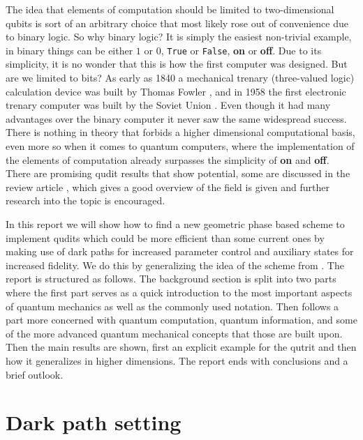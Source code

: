 \documentclass[pra,showpacs,priprent,twocolumn,superscriptaddress]{revtex4-1}
\begin{document}
The idea that elements of computation should be limited to two-dimensional qubits is sort of an arbitrary choice that most likely rose out of convenience due to binary logic. So why binary logic? It is simply the easiest non-trivial example, in binary things can be either $1$ or $0$, {\tt True} or {\tt False}, \textbf{on} or \textbf{off}. Due to its simplicity, it is no wonder that this is how the first computer was designed. But are we limited to bits? As early as 1840 a mechanical trenary (three-valued logic) calculation device was built by Thomas Fowler \cite{glusker05}, and in 1958 the first electronic trenary computer was built by the Soviet Union \cite{bursentsov11}. Even though it had many advantages over the binary computer it never saw the same widespread success. There is nothing in theory that forbids a higher dimensional computational basis, even more so when it comes to quantum computers, where the implementation of the elements of computation already surpasses the simplicity of \textbf{on} and \textbf{off}. There are promising qudit results that show potential, some are discussed in the review article \cite{wang20}, which gives a good overview of the field is given and further research into the topic is encouraged.

In this report we will show how to find a new geometric phase based scheme to implement qudits which could be more efficient than some current ones by making use of dark paths for increased parameter control and auxiliary states for increased fidelity. We do this by generalizing the idea of the scheme from \cite{ai22}. The report is structured as follows. The background section is split into two parts where the first part serves as a quick introduction to the most important aspects of quantum mechanics as well as the commonly used notation. Then follows a part more concerned with quantum computation, quantum information, and some of the more advanced quantum mechanical concepts that those are built upon. Then the main results are shown, first an explicit example for the qutrit and then how it generalizes in higher dimensions. The report ends with conclusions and a brief outlook.



\section{Dark path setting}
\end{document}
